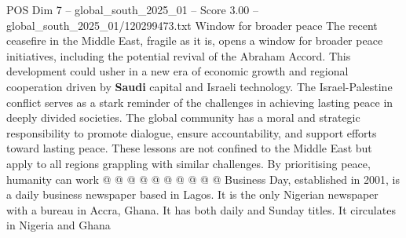 \begin{textsample}{POS Dim 7 – global\_south\_2025\_01 – Score 3.00 – global\_south\_2025\_01/120299473.txt}
Window for broader peace The recent ceasefire in the Middle East, fragile as it is, opens a window for broader peace initiatives, including the potential revival of the Abraham Accord.
This development could usher in a new era of economic growth and regional cooperation driven by \textbf{Saudi} capital and Israeli technology.
The Israel-Palestine conflict serves as a stark reminder of the challenges in achieving lasting peace in deeply divided societies.
The global community has a moral and strategic responsibility to promote dialogue, ensure accountability, and support efforts toward lasting peace.
These lessons are not confined to the Middle East but apply to all regions grappling with similar challenges.
By prioritising peace, humanity can work @ @ @ @ @ @ @ @ @ @ Business Day, established in 2001, is a daily business newspaper based in Lagos.
It is the only Nigerian newspaper with a bureau in Accra, Ghana.
It has both daily and Sunday titles.
It circulates in Nigeria and Ghana

\end{textsample}
